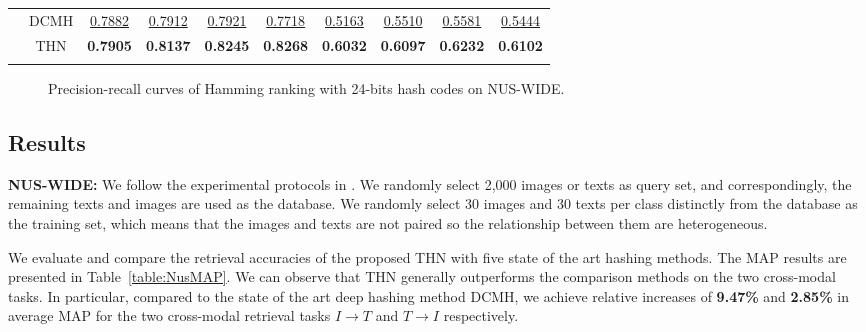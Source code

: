 \documentclass{article}
\begin{document}
\begin{table}[!htbp]
\begin{small}
\begin{tabular}{c|c|cccc|cccc}
        & DCMH \cite{cite:JDCMH16} & \underline{0.7882} & \underline{0.7912} & \underline{0.7921} & \underline{0.7718} &\underline{0.5163} & \underline{0.5510} & \underline{0.5581} & \underline{0.5444} \\
        \cline{2-10}
& THN   & \textbf{0.7905}      & \textbf{0.8137} &    \textbf{0.8245}   & \textbf{0.8268} &\textbf{0.6032}  & \textbf{0.6097}& \textbf{0.6232} & \textbf{0.6102} \\
        \Xhline{1.0pt}
    \end{tabular}
    \end{small}
    \vspace{-10pt}
\end{table}

\begin{figure*}[htb]
    \centering
		\hfil
    \vspace{-5pt}
    \caption{Precision-recall curves of Hamming ranking with 24-bits hash codes on NUS-WIDE.}
    \label{fig:pr_nus}
    \vspace{-20pt}
\end{figure*}

\subsection{Results}
\textbf{NUS-WIDE:} We follow the experimental protocols in \cite{cite:KDD14HTH}. We randomly select 2,000 images or texts as query set, and correspondingly, the remaining texts and images are used as the database. We randomly select 30 images and 30 texts per class distinctly from the database as the training set, which means that the images and texts are not paired so the relationship between them are heterogeneous.

We evaluate and compare the retrieval accuracies of the proposed THN with five state of the art hashing methods. The MAP results are presented in Table~\ref{table:NusMAP}. We can observe that THN generally outperforms the comparison methods on the two cross-modal tasks. In particular, compared to the state of the art deep hashing method DCMH, we achieve relative increases of \textbf{9.47\%} and \textbf{2.85\%} in average MAP for the two cross-modal retrieval tasks $I \to T$ and $T \to I$ respectively.
\end{document}
